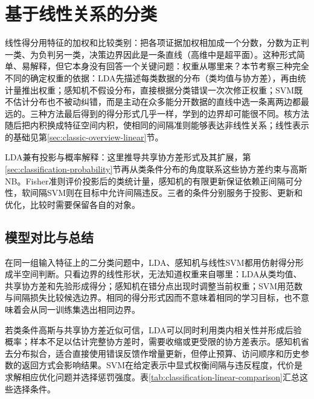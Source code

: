 \section{基于线性关系的分类}
\label{sec:classification-geometry}

线性得分用特征的加权和比较类别：把各项证据加权相加成一个分数，分数为正判一类、为负判另一类，决策边界因此是一条直线（高维中是超平面）。这种形式简单、易解释，但它本身没有回答一个关键问题：权重从哪里来？本节考察三种完全不同的确定权重的依据：LDA先描述每类数据的分布（类均值与协方差），再由统计量推出权重；感知机不假设分布，直接根据分类错误一次次修正权重；SVM既不估计分布也不被动纠错，而是主动在众多能分开数据的直线中选一条离两边都最远的。三种方法最后得到的得分形式几乎一样，学到的边界却可能很不同。核方法随后把内积换成特征空间内积，使相同的间隔准则能够表达非线性关系；线性表示的基础见第\ref{sec:classic-overview-linear}节。

LDA兼有投影与概率解释：这里推导共享协方差形式及其扩展，第\ref{sec:classification-probability}节再从类条件分布的角度联系这些协方差约束与高斯NB。Fisher准则评价投影后的类统计量，感知机的有限更新保证依赖正间隔可分性，软间隔SVM则在目标中允许间隔违反。三者的条件分别服务于投影、更新和优化，比较时需要保留各自的对象。




\subsection{模型对比与总结}
\label{sec:classification-geometry-summary}

在同一组输入特征上的二分类问题中，LDA、感知机与线性SVM都用仿射得分形成半空间判断。只看边界的线性形状，无法知道权重来自哪里：LDA从类均值、共享协方差和先验形成得分；感知机在错分点出现时调整当前权重；SVM用范数与间隔损失比较候选边界。相同的得分形式因而不意味着相同的学习目标，也不意味着会从同一训练集选出相同边界。

若类条件高斯与共享协方差近似可信，LDA可以同时利用类内相关性并形成后验概率；样本不足以估计完整协方差时，需要收缩或更受限的协方差表示。感知机省去分布拟合，适合直接使用错误反馈作增量更新，但停止预算、访问顺序和历史参数的返回方式会影响结果。SVM在给定表示中显式权衡间隔与违反程度，代价是求解相应优化问题并选择惩罚强度。表\ref{tab:classification-linear-comparison}汇总这些选择条件。

